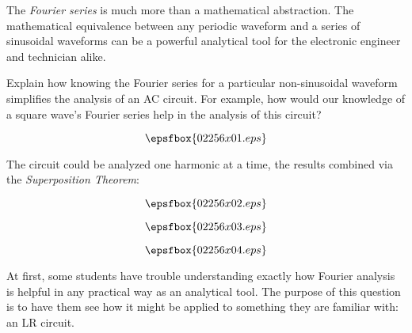 

The {\it Fourier series} is much more than a mathematical abstraction.  The mathematical equivalence between any periodic waveform and a series of sinusoidal waveforms can be a powerful analytical tool for the electronic engineer and technician alike.

Explain how knowing the Fourier series for a particular non-sinusoidal waveform simplifies the analysis of an AC circuit.  For example, how would our knowledge of a square wave's Fourier series help in the analysis of this circuit?

$$\epsfbox{02256x01.eps}$$







The circuit could be analyzed one harmonic at a time, the results combined via the {\it Superposition Theorem}:

$$\epsfbox{02256x02.eps}$$

$$\epsfbox{02256x03.eps}$$

$$\epsfbox{02256x04.eps}$$







At first, some students have trouble understanding exactly how Fourier analysis is helpful in any practical way as an analytical tool.  The purpose of this question is to have them see how it might be applied to something they are familiar with: an LR circuit.




